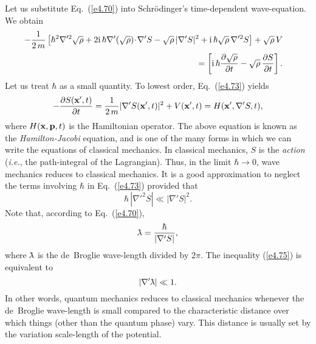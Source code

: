 Let us substitute Eq.~(\ref{e4.70}) into Schr\"{o}dinger's time-dependent wave-equation. We obtain
\begin{eqnarray}
-\frac{1}{2\,m}\left[ \hbar^2 \nabla'^2 \sqrt{\rho} + 2{\rm i}\,\hbar
\nabla'(\sqrt{\rho})\!\cdot\! \nabla' S - \sqrt{\rho}\, |\nabla' S|^2 
+{\rm i}\,\hbar \sqrt{\rho}\,\nabla'^2 S\right]
+ \sqrt{\rho}\, V& &\nonumber\\[0.5ex]
= \left[ {\rm i}\,\hbar \frac{\partial \sqrt{\rho}}{\partial t}
- \sqrt{\rho}\, \frac{\partial S}{\partial t} \right].&&\label{e4.73}
\end{eqnarray}
Let us treat $\hbar$ as a small quantity. To lowest order, Eq.~(\ref{e4.73})
yields
\begin{equation}
-\frac{\partial S({\bf x}', t)}{\partial t} = \frac{1}{2\,m} |\nabla' S({\bf x}', t)
|^2 + V ({\bf x}', t) = H({\bf x}', \nabla'
S, t),
\end{equation}
where $H({\bf x}, {\bf p}, t)$ is the Hamiltonian operator. The above equation is
known as the {\em Hamilton-Jacobi} equation, and is one of the many forms
in which we can write the equations of classical mechanics. In classical
mechanics, $S$ is the {\em action} ({\em i.e.}, the path-integral of the Lagrangian).
Thus, in the limit $\hbar\rightarrow 0$, wave mechanics reduces to classical
mechanics. It is a good approximation to neglect the terms involving
$\hbar$ in Eq.~(\ref{e4.73}) provided that
\begin{equation}\label{e4.75}
\hbar\, |\nabla'^2 S| \ll |\nabla' S|^2.
\end{equation}
Note that, according to Eq.~(\ref{e4.70}),
\begin{equation}
\lambdabar = \frac{\hbar}{|\nabla' S|},
\end{equation}
where $\lambdabar$ is the de~Broglie wave-length divided by $2\pi$. The inequality
(\ref{e4.75}) is equivalent to
\begin{equation}
|\nabla' \lambdabar| \ll 1.
\end{equation}
In other words, quantum mechanics reduces  to classical mechanics whenever the 
de~Broglie wave-length is small compared to the characteristic distance over which
things (other than the quantum phase)
 vary. This distance is usually set by the variation scale-length of the potential.
